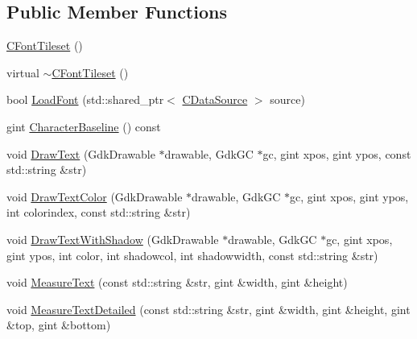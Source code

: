 \subsection*{Public Member Functions}
\begin{DoxyCompactItemize}
\item 
\hyperlink{classCFontTileset_a28d6cb7e16b6dcd4d6572dddd4d59014}{C\+Font\+Tileset} ()
\item 
virtual \hyperlink{classCFontTileset_a615232874cd33ae3d5f92ec836bf1f0b}{$\sim$\+C\+Font\+Tileset} ()
\item 
bool \hyperlink{classCFontTileset_a9564525bf20b3b5b6941e5f86827eb5d}{Load\+Font} (std\+::shared\+\_\+ptr$<$ \hyperlink{classCDataSource}{C\+Data\+Source} $>$ source)
\item 
gint \hyperlink{classCFontTileset_a888dd4fe8f46b35550386a1997f4376a}{Character\+Baseline} () const
\item 
void \hyperlink{classCFontTileset_a4121603694e96e93378e079edd27086e}{Draw\+Text} (Gdk\+Drawable $\ast$drawable, Gdk\+GC $\ast$gc, gint xpos, gint ypos, const std\+::string \&str)
\item 
void \hyperlink{classCFontTileset_a987f13f64865891b7bf8b10f0b519fb7}{Draw\+Text\+Color} (Gdk\+Drawable $\ast$drawable, Gdk\+GC $\ast$gc, gint xpos, gint ypos, int colorindex, const std\+::string \&str)
\item 
void \hyperlink{classCFontTileset_a6716e51a5692130847914287a5f1b734}{Draw\+Text\+With\+Shadow} (Gdk\+Drawable $\ast$drawable, Gdk\+GC $\ast$gc, gint xpos, gint ypos, int color, int shadowcol, int shadowwidth, const std\+::string \&str)
\item 
void \hyperlink{classCFontTileset_ad6902d89c94a309fb487d4dbdec97a15}{Measure\+Text} (const std\+::string \&str, gint \&width, gint \&height)
\item 
void \hyperlink{classCFontTileset_a7afa08157a6bea6c0fbd06299685b8b3}{Measure\+Text\+Detailed} (const std\+::string \&str, gint \&width, gint \&height, gint \&top, gint \&bottom)
\end{DoxyCompactItemize}

